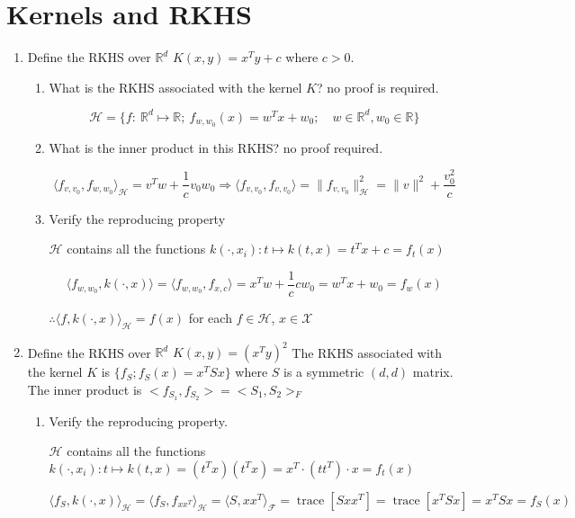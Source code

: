 \documentclass[11pt]{article}
\DeclareMathOperator{\trace}{trace}
\begin{document}
\section{Kernels and RKHS}
\begin{enumerate}
\item Define the RKHS  over $\mathbb{R}^d$ $K(x,y)=x^Ty+c$ where $c>0$. 

\begin{enumerate}
\item What is the RKHS associated with the kernel $K$? no proof is required. 

$$\mathcal{H} = \{f:\ \mathbb{R}^d\mapsto\mathbb{R};\ f_{w,w_0}(x)=w^Tx+w_0;\quad w\in\mathbb{R}^d,w_0\in\mathbb{R}\}$$





\item What is the inner product in this RKHS? no proof required.  

$$\langle f_{v,v_0},f_{w,w_0}\rangle_{\mathcal{H}}=v^Tw+\frac1cv_0w_0\Rightarrow\langle f_{v,v_0},f_{v,v_0}\rangle=\|f_{v,v_0}\|^2_{\mathcal{H}}=\|v\|^2+\frac{v_0^2}c$$


\item Verify the reproducing property

$\mathcal{H}$ contains all the functions $k(\cdot,x_i): t\mapsto k(t,x)=t^Tx+c=f_t(x)$

$$\langle f_{w,w_0},k(\cdot,x)\rangle=\langle f_{w,w_0},f_{x,c}\rangle=x^Tw+\frac1ccw_0=w^Tx+w_0=f_w(x)$$

$\therefore\langle f,k(\cdot,x)\rangle_{\mathcal{H}}=f(x)$ for each $f\in\mathcal{H}$, $x\in\mathcal{X}$

\end{enumerate}


\item Define the RKHS  over $\mathbb{R}^d$
$K(x,y)=(x^Ty)^2$
The RKHS associated with the kernel $K$ is $\{f_S;f_S(x)=x^T S x\}$ where $S$ is a symmetric $(d,d)$ matrix. The inner product is
$<f_{S_1},f_{S_2}>=<S_1,S_2>_F$



\begin{enumerate}
\item Verify the reproducing property. 

$\mathcal{H}$ contains all the functions 
$k(\cdot,x_i): t\mapsto k(t,x)=(t^Tx)(t^Tx)=x^T\cdot (tt^T)\cdot x=f_t(x)$

$$ \langle f_{S},k(\cdot,x)\rangle_{\mathcal{H}}=\langle f_{S},f_{xx^T}\rangle_{\mathcal{H}}=\langle S,xx^T\rangle_{\mathcal{F}}=\trace[Sxx^T]=\trace[x^TSx]=x^TS x= f_{S}(x)$$


\end{enumerate}
\end{enumerate}
\end{document}
